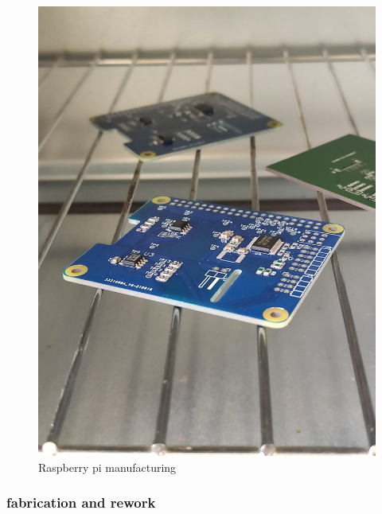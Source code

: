 \begin{figure}[h]
	\centering
	\includegraphics[width=\linewidth]{../art/pcb Manufactureing.jpeg}
	\caption{Raspberry pi manufacturing}
\end{figure}


\subsubsection{fabrication and rework}
